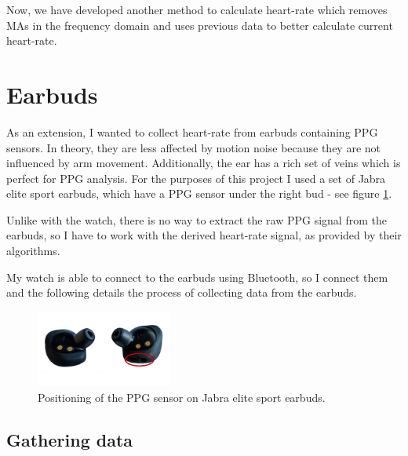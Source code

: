 \documentclass[12pt,a4paper,twoside,openany]{report}
\begin{document}
%
%
%
%

Now, we have developed another method to calculate heart-rate which
removes MAs in the frequency domain and uses previous data to better calculate
current heart-rate.

\section{Earbuds}

As an extension, I wanted to collect heart-rate from earbuds containing PPG
sensors. In theory, they 
are less affected by motion noise
because they are not influenced by arm movement. Additionally, the ear has a rich set
of veins which is perfect for PPG analysis. For the purposes of this project I used
a set of Jabra elite sport earbuds, which have a PPG sensor under the right
bud - see figure \ref{fig:jabra}. 

Unlike with the watch, there is no way to extract the raw PPG signal from the
earbuds, so I have to work with the derived heart-rate signal, as provided by
their algorithms. 

My watch is able to connect to the earbuds using Bluetooth, so I connect them
and
the following details the process of collecting data from the earbuds. 

\begin{figure}[tbh]
	\centerline{\includegraphics[width=0.4\textwidth]{figs/jabra.png}}
	\caption{Positioning of the PPG sensor on Jabra elite sport earbuds.}
	\label{fig:jabra}
\end{figure}

\subsection{Gathering data}
\end{document}

